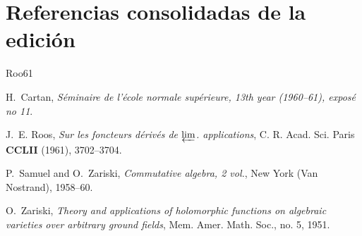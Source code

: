 \documentclass[10pt,oneside,openany]{book}
\theoremstyle{egaenv}\newtheorem*{env}{---}
\theoremstyle{egastatement}
\theoremstyle{egadescription}
\begin{document}


\clearpage
{}
{}
\section*{Referencias consolidadas de la edición}
\begin{thebibliography}{Roo61}

H.~Cartan, \emph{S\'eminaire de l'\'ecole normale sup\'erieure, 13th year
  (1960--61), expos\'e no 11}.

J.~E. Roos, \emph{Sur les foncteurs d\'eriv\'es de $\varprojlim$.
  applications}, C. R. Acad. Sci. Paris \textbf{CCLII} (1961), 3702--3704.

P.~Samuel and O.~Zariski, \emph{Commutative algebra, 2 vol.}, New York (Van
  Nostrand), 1958--60.

O.~Zariski, \emph{Theory and applications of holomorphic functions on algebraic
  varieties over arbitrary ground fields}, Mem. Amer. Math. Soc., no. 5, 1951.

\end{thebibliography}
\end{document}
